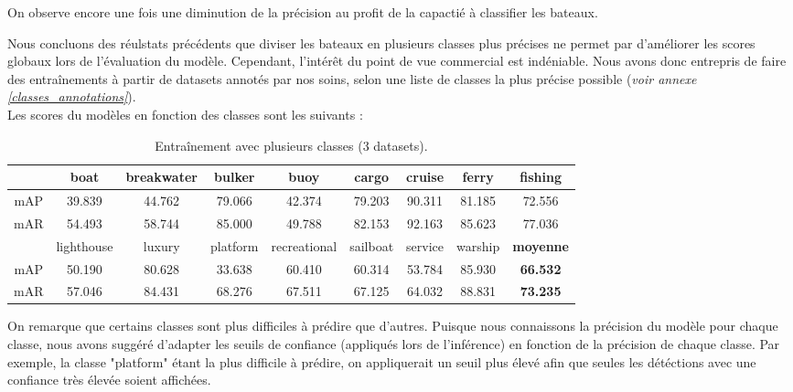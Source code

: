 On observe encore une fois une diminution de la précision au profit de la capactié à classifier
les bateaux.

Nous concluons des réulstats précédents que diviser les bateaux en plusieurs classes plus précises
ne permet par d'améliorer les scores globaux lors de l'évaluation du modèle. Cependant,
l'intérêt du point de vue commercial est indéniable. Nous avons donc entrepris de faire des
entraînements à partir de datasets annotés par nos soins, selon une liste de classes
la plus précise possible (\textit{voir annexe \ref{classes_annotations}}).\\

Les scores du modèles en fonction des classes sont les suivants : \\

\begin{table}[H]
    \begin{center}
        \begin{tabular}{c c c c c c c c c}
            \hline
            & boat & breakwater & bulker & buoy & cargo & cruise & ferry & fishing \\
            \hline
            mAP & 39.839 & 44.762 & 79.066 & 42.374 & 79.203 & 90.311 & 81.185 & 72.556 \\
            mAR & 54.493 & 58.744 & 85.000 & 49.788 & 82.153 & 92.163 & 85.623 & 77.036 \\
            \hline
            & lighthouse & luxury & platform & recreational & sailboat & service & warship & \textbf{moyenne} \\
            \hline
            mAP & 50.190 & 80.628 & 33.638 & 60.410 & 60.314 & 53.784 & 85.930 & \textbf{66.532 }\\
            mAR & 57.046 & 84.431 & 68.276 & 67.511 & 67.125 & 64.032 & 88.831 & \textbf{73.235 }\\
        \end{tabular}
    \end{center}
    \caption{Entraînement avec plusieurs classes (3 datasets).}
\end{table}

On remarque que certains classes sont plus difficiles à prédire que d'autres.
Puisque nous connaissons la précision du modèle pour chaque classe, nous avons suggéré d'adapter les
seuils de confiance (appliqués lors de l'inférence) en fonction de la précision de chaque classe.
Par exemple, la classe "platform" étant la plus difficile à prédire, on appliquerait un seuil plus élevé afin
que seules les détéctions avec une confiance très élevée soient affichées.

